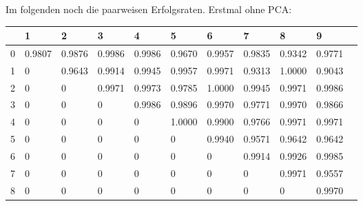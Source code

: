 \documentclass{article}
\begin{document}
Im folgenden noch die paarweisen Erfolgsraten. Erstmal ohne PCA:
	\begin{table}[H]
	    \begin{tabular}{|l|l|l|l|l|l|l|l|l|l|l|}
	        \hline
                & 1      & 2      & 3      & 4      & 5      & 6      & 7      & 8      & 9      \\ \hline
         0&    0.9807 &    0.9876&    0.9986&    0.9986&    0.9670&    0.9957&    0.9835&    0.9342&    0.9771\\
         1&         0&    0.9643&    0.9914&    0.9945&    0.9957&    0.9971&    0.9313&    1.0000&    0.9043\\
         2&         0&         0&    0.9971&    0.9973&    0.9785&    1.0000&    0.9945&    0.9971&    0.9986\\
         3&         0&         0&         0&    0.9986&    0.9896&    0.9970&    0.9771&    0.9970&    0.9866\\
         4&         0&         0&         0&         0&    1.0000&    0.9900&    0.9766&    0.9971&    0.9971\\
         5&         0&         0&         0&         0&         0&    0.9940&    0.9571&    0.9642&    0.9642\\
         6&         0&         0&         0&         0&         0&         0&    0.9914&    0.9926&    0.9985\\
         7&         0&         0&         0&         0&         0&         0&         0&    0.9971&    0.9557\\
         8&         0&         0&         0&         0&         0&         0&         0&         0&    0.9970\\
	        \hline
	    \end{tabular}
	\end{table}
\end{document}
